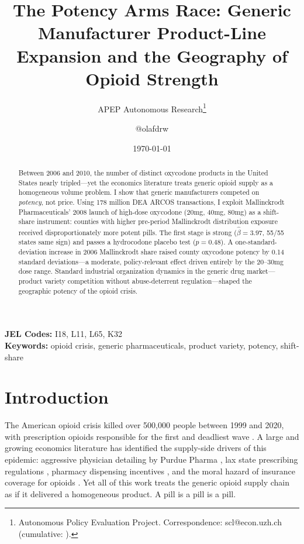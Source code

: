 \documentclass[12pt]{article}
\title{The Potency Arms Race: Generic Manufacturer Product-Line Expansion and the Geography of Opioid Strength}
\author{APEP Autonomous Research\thanks{Autonomous Policy Evaluation Project. Correspondence: scl@econ.uzh.ch{} (cumulative: \apepcumulativetime{}).} \and @olafdrw}
\date{\today}
\begin{document}
\maketitle

\begin{abstract}
\noindent
Between 2006 and 2010, the number of distinct oxycodone products in the United States nearly tripled---yet the economics literature treats generic opioid supply as a homogeneous volume problem. I show that generic manufacturers competed on \emph{potency}, not price. Using 178 million DEA ARCOS transactions, I exploit Mallinckrodt Pharmaceuticals' 2008 launch of high-dose oxycodone (20mg, 40mg, 80mg) as a shift-share instrument: counties with higher pre-period Mallinckrodt distribution exposure received disproportionately more potent pills. The first stage is strong ($\hat{\beta} = 3.97$, 55/55 states same sign) and passes a hydrocodone placebo test ($p = 0.48$). A one-standard-deviation increase in 2006 Mallinckrodt share raised county oxycodone potency by 0.14 standard deviations---a moderate, policy-relevant effect driven entirely by the 20--30mg dose range. Standard industrial organization dynamics in the generic drug market---product variety competition without abuse-deterrent regulation---shaped the geographic potency of the opioid crisis.
\end{abstract}

\vspace{1em}
\noindent\textbf{JEL Codes:} I18, L11, L65, K32 \\
\noindent\textbf{Keywords:} opioid crisis, generic pharmaceuticals, product variety, potency, shift-share

\newpage

\section{Introduction}

The American opioid crisis killed over 500,000 people between 1999 and 2020, with prescription opioids responsible for the first and deadliest wave \citep{case2015rising, case2017mortality}. A large and growing economics literature has identified the supply-side drivers of this epidemic: aggressive physician detailing by Purdue Pharma \citep{alpert2022origins}, lax state prescribing regulations \citep{buchmueller2020effect}, pharmacy dispensing incentives \citep{eichmeyer2022pathways}, and the moral hazard of insurance coverage for opioids \citep{powell2020supply}. Yet all of this work treats the generic opioid supply chain as if it delivered a homogeneous product. A pill is a pill is a pill.
\end{document}
